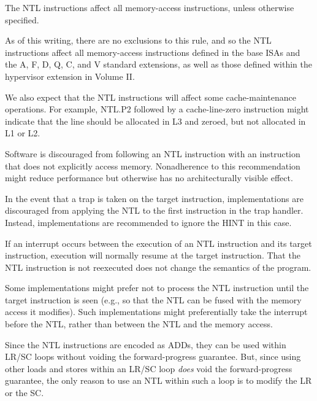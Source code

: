 The NTL instructions affect all memory-access instructions, unless otherwise
specified.

\begin{commentary}
As of this writing, there are no exclusions to this rule, and so
the NTL instructions affect all memory-access instructions
defined in the base ISAs and the A, F, D, Q, C, and V standard extensions,
as well as those defined within the hypervisor extension in Volume II.

We also expect that the NTL instructions will affect some cache-maintenance
operations.
For example, NTL.P2 followed by a cache-line-zero instruction might indicate
that the line should be allocated in L3 and zeroed, but not allocated in
L1 or L2.
\end{commentary}

Software is discouraged from following an NTL instruction with an
instruction that does not explicitly access memory.
Nonadherence to this recommendation might reduce performance but
otherwise has no architecturally visible effect.

In the event that a trap is taken on the target instruction,
implementations are discouraged from applying the NTL to the first instruction
in the trap handler.
Instead, implementations are recommended to ignore the HINT in this case.

\begin{commentary}
If an interrupt occurs between the execution of an NTL instruction and its
target instruction, execution will normally resume at the
target instruction.
That the NTL instruction is not reexecuted does not change the semantics of
the program.

Some implementations might prefer not to process the NTL instruction until the
target instruction is seen (e.g., so that the NTL can be
fused with the memory access it modifies).
Such implementations might preferentially take the interrupt before the NTL,
rather than between the NTL and the memory access.
\end{commentary}

\begin{commentary}
Since the NTL instructions are encoded as ADDs, they can be used within LR/SC
loops without voiding the forward-progress guarantee.
But, since using other loads and stores within an LR/SC loop {\em does}
void the forward-progress guarantee, the only reason to use an NTL
within such a loop is to modify the LR or the SC.
\end{commentary}
